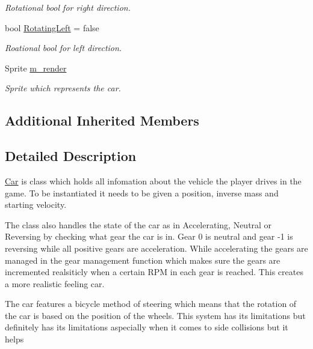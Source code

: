 \begin{DoxyCompactItemize}
\begin{DoxyCompactList}\small\item\em Rotational bool for right direction. \end{DoxyCompactList}\item 
\hypertarget{class_car_a936486153a35079ef6faf7dd6ebdddbc}{}bool \hyperlink{class_car_a936486153a35079ef6faf7dd6ebdddbc}{Rotating\+Left} = false\label{class_car_a936486153a35079ef6faf7dd6ebdddbc}

\begin{DoxyCompactList}\small\item\em Roational bool for left direction. \end{DoxyCompactList}\item 
\hypertarget{class_car_aeaaafebefc59dfd9d3976b5bf3ac37e2}{}Sprite \hyperlink{class_car_aeaaafebefc59dfd9d3976b5bf3ac37e2}{m\+\_\+render}\label{class_car_aeaaafebefc59dfd9d3976b5bf3ac37e2}

\begin{DoxyCompactList}\small\item\em Sprite which represents the car. \end{DoxyCompactList}\end{DoxyCompactItemize}
\subsection*{Additional Inherited Members}


\subsection{Detailed Description}
\hyperlink{class_car}{Car} is class which holds all infomation about the vehicle the player drives in the game. To be instantiated it needs to be given a position, inverse mass and starting velocity.

The class also handles the state of the car as in Accelerating, Neutral or Reversing by checking what gear the car is in. Gear 0 is neutral and gear -\/1 is reversing while all positive gears are acceleration. While accelerating the gears are managed in the gear management function which makes sure the gears are incremented realsiticly when a certain R\+P\+M in each gear is reached. This creates a more realistic feeling car.

The car features a bicycle method of steering which means that the rotation of the car is based on the position of the wheels. This system has its limitations but definitely has its limitations aspecially when it comes to side collisions but it helps

